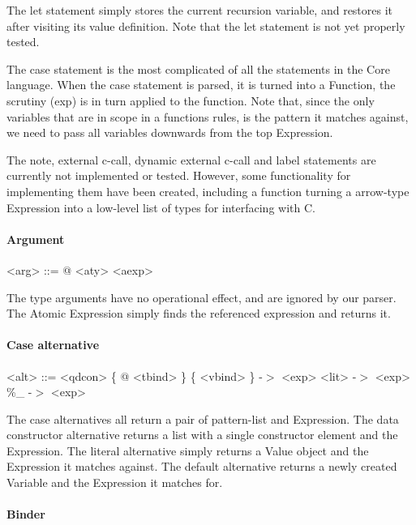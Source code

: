 The let statement simply stores the current recursion variable, and restores it after
visiting its value definition. Note that the let statement is not yet properly tested.

The case statement is the most complicated of all the statements in the Core language.
When the case statement is parsed, it is turned into a Function, the scrutiny (exp) 
is in turn applied to the function. Note that, since the only variables that are in
scope in a functions rules, is the pattern it matches against, we need to pass all 
variables downwards from the top Expression.

The note, external c-call, dynamic external c-call and label statements are currently
not implemented or tested. However, some functionality for implementing them have been
created, including a function turning a arrow-type Expression into a low-level list
of types for interfacing with C.

\paragraph{Argument}

\begin{grammar}
<arg> ::= @ <aty>
     \alt <aexp>
\end{grammar}

The type arguments have no operational effect, and are ignored by our parser.
The Atomic Expression simply finds the referenced expression and returns it.

\paragraph{Case alternative}

\begin{grammar}
<alt> ::= <qdcon> \{ @ <tbind> \} \{ <vbind> \} -$>$ <exp>
     \alt <lit> -$>$ <exp>
     \alt \%\_ -$>$ <exp>
\end{grammar}

The case alternatives all return a pair of pattern-list and Expression. The
data constructor alternative returns a list with a single constructor element and
the Expression. The literal alternative simply returns a Value object and the 
Expression it matches against. The default alternative returns a newly created
Variable and the Expression it matches for.

\paragraph{Binder}

